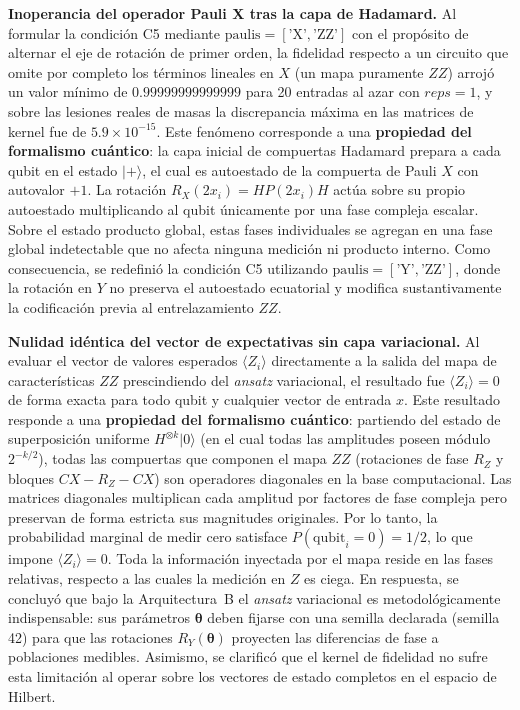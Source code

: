 \textbf{Inoperancia del operador Pauli X tras la capa de Hadamard.} Al formular la condición C5 mediante
$\text{paulis} = [\text{'X'},\text{'ZZ'}]$ con el propósito de alternar el eje de rotación de primer orden,
la fidelidad respecto a un circuito que omite por completo los términos lineales en $X$ (un mapa puramente $ZZ$) arrojó
un valor mínimo de $0.99999999999999$ para 20 entradas al azar con $reps = 1$, y sobre las lesiones reales de masas la
discrepancia máxima en las matrices de kernel fue de $5.9 \times 10^{-15}$. Este fenómeno corresponde a una
\textbf{propiedad del formalismo cuántico}: la capa inicial de compuertas Hadamard prepara a cada qubit en el estado
$|+\rangle$, el cual es autoestado de la compuerta de Pauli $X$ con autovalor $+1$. La rotación $R_X(2x_i) = H P(2x_i) H$
actúa sobre su propio autoestado multiplicando al qubit únicamente por una fase compleja escalar. Sobre el estado producto
global, estas fases individuales se agregan en una fase global indetectable que no afecta ninguna medición ni producto
interno. Como consecuencia, se redefinió la condición
C5 utilizando $\text{paulis} = [\text{'Y'},\text{'ZZ'}]$, donde la rotación en $Y$ no preserva el autoestado ecuatorial
y modifica sustantivamente la codificación previa al entrelazamiento $ZZ$.

\textbf{Nulidad idéntica del vector de expectativas sin capa variacional.} Al evaluar el vector de valores
esperados $\langle Z_i \rangle$ directamente a la salida del mapa de características $ZZ$ prescindiendo del \textit{ansatz}
variacional, el resultado fue $\langle Z_i \rangle = 0$ de forma exacta para todo qubit y cualquier vector de entrada $x$.
Este resultado responde a una \textbf{propiedad del formalismo cuántico}: partiendo del estado de superposición uniforme
$H^{\otimes k}|0\rangle$ (en el cual todas las amplitudes poseen módulo $2^{-k/2}$), todas las compuertas que componen el
mapa $ZZ$ (rotaciones de fase $R_Z$ y bloques $CX-R_Z-CX$) son operadores diagonales en la base computacional. Las matrices
diagonales multiplican cada amplitud por factores de fase compleja pero preservan de forma estricta sus magnitudes originales.
Por lo tanto, la probabilidad marginal de medir cero satisface $P(\text{qubit}_i = 0) = 1/2$, lo que impone $\langle Z_i \rangle = 0$.
Toda la información inyectada por el mapa reside en las fases relativas, respecto a las cuales la medición en $Z$ es ciega.
En respuesta, se concluyó que bajo la Arquitectura~B el \textit{ansatz} variacional es metodológicamente indispensable:
sus parámetros $\boldsymbol\theta$ deben fijarse con una semilla declarada (semilla 42) para que las rotaciones $R_Y(\boldsymbol\theta)$
proyecten las diferencias de fase a poblaciones medibles. Asimismo, se clarificó que el kernel de fidelidad no sufre esta
limitación al operar sobre los vectores de estado completos en el espacio de Hilbert.

